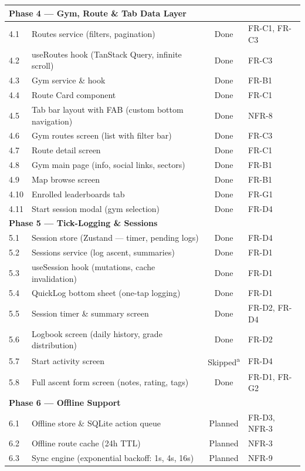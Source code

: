 \documentclass[12pt,a4paper]{report}
\renewcommand\_{\textunderscore\hspace{0pt}}
\begin{document}
\begin{longtable}{l >{\raggedright\arraybackslash}p{7.5cm} c >{\raggedright\arraybackslash}p{3cm}}
\hline
\multicolumn{4}{l}{\textbf{Phase 4 --- Gym, Route \& Tab Data Layer}} \\
\hline
4.1 & Routes service (filters, pagination) & Done & FR-C1, FR-C3 \\
4.2 & useRoutes hook (TanStack Query, infinite scroll) & Done & FR-C3 \\
4.3 & Gym service \& hook & Done & FR-B1 \\
4.4 & Route Card component & Done & FR-C1 \\
4.5 & Tab bar layout with FAB (custom bottom navigation) & Done & NFR-8 \\
4.6 & Gym routes screen (list with filter bar) & Done & FR-C3 \\
4.7 & Route detail screen & Done & FR-C1 \\
4.8 & Gym main page (info, social links, sectors) & Done & FR-B1 \\
4.9 & Map browse screen & Done & FR-B1 \\
4.10 & Enrolled leaderboards tab & Done & FR-G1 \\
4.11 & Start session modal (gym selection) & Done & FR-D4 \\

\hline
\multicolumn{4}{l}{\textbf{Phase 5 --- Tick-Logging \& Sessions}} \\
\hline
5.1 & Session store (Zustand --- timer, pending logs) & Done & FR-D4 \\
5.2 & Sessions service (log ascent, summaries) & Done & FR-D1 \\
5.3 & useSession hook (mutations, cache invalidation) & Done & FR-D1 \\
5.4 & QuickLog bottom sheet (one-tap logging) & Done & FR-D1 \\
5.5 & Session timer \& summary screen & Done & FR-D2, FR-D4 \\
5.6 & Logbook screen (daily history, grade distribution) & Done & FR-D2 \\
5.7 & Start activity screen & Skipped\textsuperscript{a} & FR-D4 \\
5.8 & Full ascent form screen (notes, rating, tags) & Done & FR-D1, FR-G2 \\

\hline
\multicolumn{4}{l}{\textbf{Phase 6 --- Offline Support}} \\
\hline
6.1 & Offline store \& SQLite action queue & Planned & FR-D3, NFR-3 \\
6.2 & Offline route cache (24h TTL) & Planned & NFR-3 \\
6.3 & Sync engine (exponential backoff: 1s, 4s, 16s) & Planned & NFR-9 \\


\end{longtable}
\end{document}

